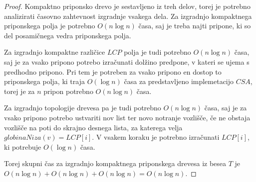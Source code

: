 \begin{proof}
    Kompaktno priponsko drevo je sestavljeno iz treh delov, torej je potrebno analizirati časovno zahtevnost izgradnje vsakega dela. Za izgradnjo kompaktnega priponskega polja je potrebno $O(n\log{n})$ časa, saj je treba najti pripone, ki so del posamičnega vedra priponskega polja.
    
    Za izgradnjo kompaktne različice $LCP$ polja je tudi potrebno $O(n\log{n})$ časa, saj je za vsako pripono potrebo izračunati dolžino predpone, v kateri se ujema s predhodno pripono. Pri tem je potreben za vsako pripono en dostop to priponskega polja, ki traja $O(\log{n})$ časa za predstavljeno implemetacijo $CSA$, torej je za $n$ pripon potrebno $O(n\log{n})$ časa.

    Za izgradnjo topologije drevesa pa je tudi potrebno $O(n\log{n})$ časa, saj je za vsako pripono potrebo ustvariti nov list ter novo notranje vozlišče, če ne obstaja vozlišče na poti do skrajno desnega lista, za katerega velja $globinaNiza(v)=LCP[i]$. V vsakem koraku je potrebno izračunati $LCP[i]$, ki potrebuje $O(\log{n})$ časa.

    Torej skupni čas za izgradnjo kompaktnega priponskega drevesa iz besea $T$ je $O(n\log{n})+O(n\log{n})+O(n\log{n})=O(n\log{n})$.
\end{proof}

